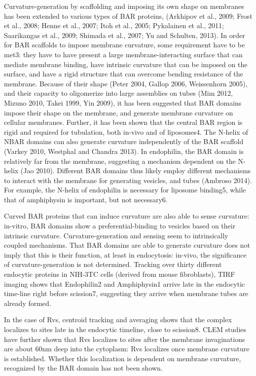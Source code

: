 Curvature-generation by scaffolding and imposing its own shape on membranes has been extended to various types of BAR proteins, (Arkhipov et al., 2009; Frost et al., 2008; Henne et al., 2007; Itoh et al., 2005; Pykalainen et al., 2011; Saarikangas et al., 2009; Shimada et al., 2007; Yu and Schulten, 2013). In order for BAR scaffolds to impose membrane curvature, some requirement have to be met3: they have to have present a large membrane-interacting surface that can mediate membrane binding, have intrinsic curvature that can be imposed on the surface, and have a rigid structure that can overcome bending resistance of the membrane. Because of their shape (Peter 2004, Gallop 2006, Weissenhorn 2005), and their capacity to oligomerize into large assemblies on tubes (Mim 2012, Mizuno 2010, Takei 1999, Yin 2009), it has been suggested that BAR domains impose their shape on the membrane, and generate membrane curvature on cellular membranes. Further, it has been shown that the central BAR region is rigid and required for tubulation, both in-vivo and of liposomes4. The N-helix of NBAR domains can also generate curvature independently of the BAR scaffold (Varkey 2010, Westphal and Chandra 2013). In endophilin, the BAR domain is relatively far from the membrane, suggesting a mechanism dependent on the N-helix (Jao 2010). Different BAR domains thus likely employ different mechanisms to interact with the membrane for generating vesicles, and tubes (Ambroso 2014). For example, the N-helix of endophilin is necessary for liposome binding5, while that of amphiphysin is important, but not necessary6. 


\vspace{5mm}
Curved BAR proteins that can induce curvature are also able to sense curvature: in-vitro, BAR domains show a preferential-binding to vesicles based on their intrinsic curvature. Curvature-generation and sensing seem to intrinsically coupled mechanisms. That BAR domains are able to generate curvature does not imply that this is their function, at least in endocytosis: in-vivo, the significance of curvature-generation is not determined. Tracking over thirty different endocytic proteins in NIH-3TC cells (derived from mouse fibroblasts), TIRF imaging shows that Endophilin2 and Amphiphysin1 arrive late in the endocytic time-line right before scission7, suggesting they arrive when membrane tubes are already formed. 


\vspace{5mm}
In the case of Rvs, centroid tracking and averaging shows that the complex localizes to sites late in the endocytic timeline, close to scission8. CLEM studies have further shown that Rvs localizes to sites after the membrane invaginations are about 60nm deep into the cytoplasm: Rvs localizes once membrane curvature is established. Whether this localization is dependent on membrane curvature, recognized by the BAR domain has not been shown. 



